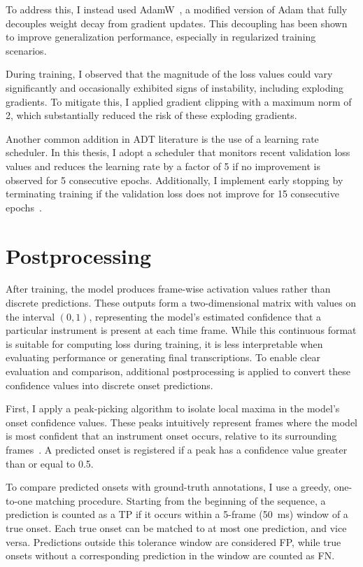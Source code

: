 To address this, I instead used AdamW~\cite{loshchilov2019decoupledweightdecayregularization}, a modified version of Adam that fully decouples weight decay from gradient updates. This decoupling has been shown to improve generalization performance, especially in regularized training scenarios.

During training, I observed that the magnitude of the loss values could vary significantly and occasionally exhibited signs of instability, including exploding gradients. To mitigate this, I applied gradient clipping with a maximum norm of 2, which substantially reduced the risk of these exploding gradients.

Another common addition in \gls{ADT} literature is the use of a learning rate scheduler. In this thesis, I adopt a scheduler that monitors recent validation loss values and reduces the learning rate by a factor of 5 if no improvement is observed for 5 consecutive epochs. Additionally, I implement early stopping by terminating training if the validation loss does not improve for 15 consecutive epochs~\cite{chang2024yourmt3+, signals4040042}.

\section{Postprocessing}

After training, the model produces frame-wise activation values rather than discrete predictions. These outputs form a two-dimensional matrix with values on the interval $(0, 1)$, representing the model's estimated confidence that a particular instrument is present at each time frame. While this continuous format is suitable for computing loss during training, it is less interpretable when evaluating performance or generating final transcriptions. To enable clear evaluation and comparison, additional postprocessing is applied to convert these confidence values into discrete onset predictions.

First, I apply a peak-picking algorithm to isolate local maxima in the model's onset confidence values. These peaks intuitively represent frames where the model is most confident that an instrument onset occurs, relative to its surrounding frames~\cite{Bck2012EvaluatingTO, vogl2018multiinstrumentdrumtranscription}. A predicted onset is registered if a peak has a confidence value greater than or equal to 0.5.

To compare predicted onsets with ground-truth annotations, I use a greedy, one-to-one matching procedure. Starting from the beginning of the sequence, a prediction is counted as a \acrfull{TP} if it occurs within a 5-frame (50~ms) window of a true onset. Each true onset can be matched to at most one prediction, and vice versa. Predictions outside this tolerance window are considered \acrfull{FP}, while true onsets without a corresponding prediction in the window are counted as \acrfull{FN}.

